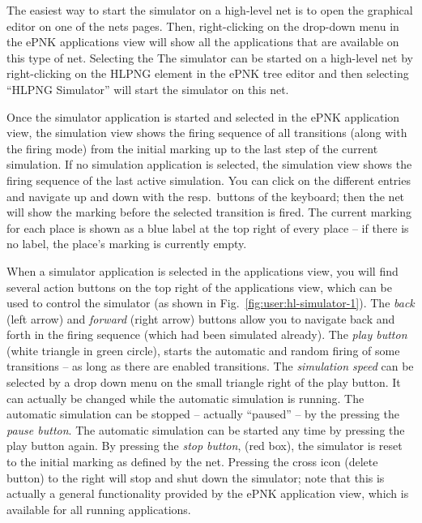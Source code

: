 The easiest way to start the simulator on a high-level net is to open
the graphical editor on one of the nets pages. Then, right-clicking on
the drop-down menu in the ePNK applications view will show all the
applications that are available on this type of net. Selecting the
The simulator can be started on a high-level net by right-clicking on the
HLPNG element in the ePNK tree editor and then selecting ``HLPNG Simulator''
will start the simulator on this net.

Once the simulator application is started and selected in the ePNK application view,
the simulation view shows the firing sequence of all transitions (along with the firing mode)
from the initial marking up to the last step of the current simulation.
If no simulation application is selected, the simulation view shows the
firing sequence of the last active simulation.  You can click on the different
entries and navigate up and down with the resp.\ buttons of the keyboard; then
the net will show the marking before the selected transition is fired. The
current marking for each place is shown as a blue label at the
top right of every place -- if there is no label, the place's marking is
currently empty.

When a simulator application is selected in the applications view, you will
find several action buttons on the top right of the applications view, which
can be used to control the simulator (as shown in
Fig.~\ref{fig:user:hl-simulator-1}). The \emph{back}%
(left arrow) and \emph{forward}%
(right arrow) buttons allow you to
navigate back and forth in the firing sequence (which had been simulated
already). The \emph{play button} (white triangle in green circle), starts the
automatic and random firing of some transitions -- as long as there are
enabled transitions. The \emph{simulation speed}%
can be selected by a drop
down menu on the small triangle right of the play button. It can actually
be changed while the automatic simulation is running. The automatic
simulation can be stopped -- actually ``paused'' -- by the pressing the
\emph{pause button}.%
The automatic simulation can be started any time by pressing the play button
again. By pressing the \emph{stop button},%
(red box), the simulator is reset to the initial marking as defined by
the net. Pressing the cross icon (delete button) to the right will stop
and shut down the simulator; note that this is actually a general functionality provided by the
ePNK application view, which is available for all running applications.


